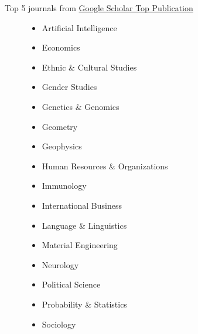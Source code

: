Top 5 journals from \href{https://scholar.google.com/citations?view_op=top_venues}{Google Scholar Top Publication}

\begin{figure}
    \centering
    \begin{minipage}[t]{0.4\textwidth}\centering
    	\begin{itemize}
    		\item Artificial Intelligence
			\item Economics
			\item Ethnic \& Cultural Studies
			\item Gender Studies
			\item Genetics \& Genomics
			\item Geometry
			\item Geophysics
			\item Human Resources \& Organizations
    	\end{itemize}
    \end{minipage}\hfill
    \begin{minipage}[t]{0.4\textwidth}\centering
    	\begin{itemize}
    		\item Immunology
			\item International Business
			\item Language \& Linguistics
			\item Material Engineering
			\item Neurology
			\item Political Science
			\item Probability \& Statistics
			\item Sociology
		\end{itemize}
    \end{minipage}
\end{figure}